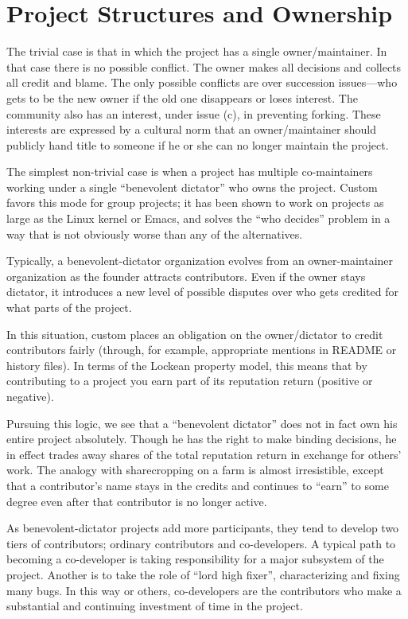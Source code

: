 \section{Project Structures and Ownership}


The trivial case is that in which the project has a single owner/maintainer.  In
that case there is no possible conflict.  The owner makes all decisions and
collects all credit and blame.  The only possible conflicts are over succession
issues—who gets to be the new owner if the old one disappears or loses interest.
The community also has an interest, under issue (c), in preventing forking.
These interests are expressed by a cultural norm that an owner/maintainer should
publicly hand title to someone if he or she can no longer maintain the project.

The simplest non-trivial case is when a project has multiple co-maintainers
working under a single ``benevolent dictator'' who owns the project.  Custom
favors this mode for group projects; it has been shown to work on projects as
large as the Linux kernel or Emacs, and solves the ``who decides'' problem in a
way that is not obviously worse than any of the alternatives.

Typically, a benevolent-dictator organization evolves from an owner-maintainer
organization as the founder attracts contributors.  Even if the owner stays
dictator, it introduces a new level of possible disputes over who gets credited
for what parts of the project.

In this situation, custom places an obligation on the owner/dictator to credit
contributors fairly (through, for example, appropriate mentions in README or
history files).  In terms of the Lockean property model, this means that by
contributing to a project you earn part of its reputation return (positive or
negative).

Pursuing this logic, we see that a ``benevolent dictator'' does not in fact own
his entire project absolutely.  Though he has the right to make binding
decisions, he in effect trades away shares of the total reputation return in
exchange for others' work.  The analogy with sharecropping on a farm is almost
irresistible, except that a contributor's name stays in the credits and
continues to ``earn'' to some degree even after that contributor is no longer
active.

As benevolent-dictator projects add more participants, they tend to develop two
tiers of contributors; ordinary contributors and co-developers.  A typical path
to becoming a co-developer is taking responsibility for a major subsystem of the
project.  Another is to take the role of ``lord high fixer'', characterizing and
fixing many bugs.  In this way or others, co-developers are the contributors who
make a substantial and continuing investment of time in the project.

